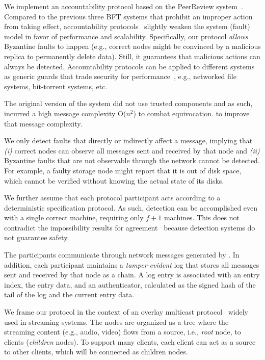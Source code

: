 We implement an accountability protocol based on the PeerReview system~\cite{bftdetection, peer-review}. Compared to the previous three BFT systems that prohibit an improper action from taking effect, accountability protocols~\cite{268272, bftdetection, peer-review} slightly weaken the system (fault) model in favor of performance and scalability. Specifically, our protocol {\em allows} Byzantine faults to happen (e.g., correct nodes might be convinced by a malicious replica to permanently delete data). Still, it guarantees that malicious actions can always be detected. Accountability protocols can be applied to different systems as generic guards that trade security for performance~\cite{peer-review}, e.g., networked file systems, bit-torrent systems, etc. 

The original version of the system did not use trusted components and as such, incurred a high message complexity O($n^2$) to combat equivocation. \projecttitle{} to improve that message complexity.

 We only detect faults that directly or indirectly affect a message, implying that {\em (i)} correct nodes 
can observe all messages sent and received by that node and {\em (ii)}  Byzantine faults that are not observable through the network cannot be detected. For example, a faulty storage node might report that it is out of disk space, which cannot be verified without knowing the actual state of its disks.

We further assume that each protocol participant acts according to a deterministic specification protocol. As such, detection can be accomplished even with a single correct machine, requiring only $f+1$ machines. This does not contradict the impossibility results for agreement~\cite{FLP} because detection systems do not guarantee safety.


 The participants communicate through network messages generated by \projecttitle{}.  In addition, each participant maintains a {\em tamper-evident} log that stores all messages sent and received by that node as a chain. A log entry is associated with an entry index, the entry data, and an authenticator, calculated as the signed hash of the tail of the log and the current entry data. 

We frame our protocol in the context of an overlay multicast protocol~\cite{10.1145/945445.945474} widely used in streaming systems. The nodes are organized as a tree where the streaming content (e.g., audio, video) flows from a source, i.e., {\em root} node, to clients ({\em children} nodes). To support many clients, each client can act as a source to other clients, which will be connected as children nodes. 

